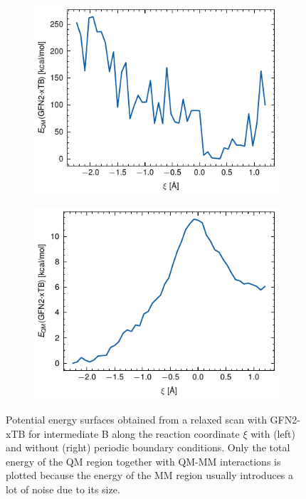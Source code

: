 \begin{figure}[htbp]
    \centering
    \begin{subfigure}{.49\textwidth}
        \centering
        \includegraphics{Figures/PES_xtb_PBC.pdf}
    \end{subfigure}
    \begin{subfigure}{.49\textwidth}
        \centering
        \includegraphics{Figures/PES_xtb.pdf}
    \end{subfigure}
    \caption{Potential energy surfaces obtained from a relaxed scan with GFN2-xTB for intermediate B along the reaction coordinate $\xi$ with (left) and without (right) periodic boundary conditions. Only the total energy of the QM region together with QM-MM interactions is plotted because the energy of the MM region usually introduces a lot of noise due to its size.}
    \label{fig:PES_xtb}
\end{figure}
